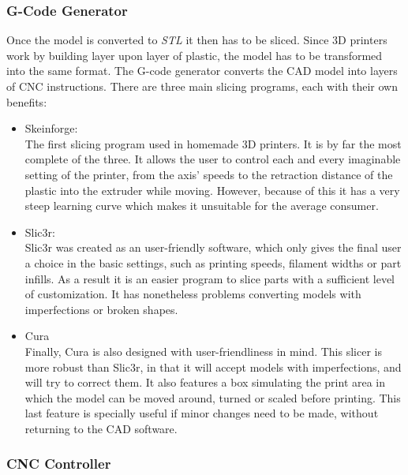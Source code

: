		\subsubsection{G-Code Generator} 
		Once the model is converted to \textit{STL} it then has to be sliced. Since 3D printers work by building layer upon layer of plastic, the model has to be transformed into the same format. The G-code generator converts the CAD model into layers of CNC instructions. There are three main slicing programs, each with their own benefits:

			\begin{itemize}
			  
			  \item Skeinforge: \hfill \\
			  The first slicing program used in homemade 3D printers. It is by far the most complete of the three. It allows the user to control each and every imaginable setting of the printer, from the axis' speeds to the retraction distance of the plastic into the extruder while moving. However, because of this it has a very steep learning curve which makes it unsuitable for the average consumer.

			  \item Slic3r:  \hfill \\
			  Slic3r was created as an user-friendly software, which only gives the final user a choice in the basic settings, such as printing speeds, filament widths or part infills. As a result it is an easier program to slice parts with a sufficient level of customization. It has nonetheless problems converting models with imperfections or broken shapes.
			  
			  \item Cura \hfill \\
			  Finally, Cura is also designed with user-friendliness in mind. This slicer is more robust than Slic3r, in that it will accept models with imperfections, and will try to correct them. It also features a box simulating the print area in which the model can be moved around, turned or scaled before printing.
			  This last feature is specially useful if minor changes need to be made, without returning to the CAD software.
			
			\end{itemize}



		\subsubsection{CNC Controller}













